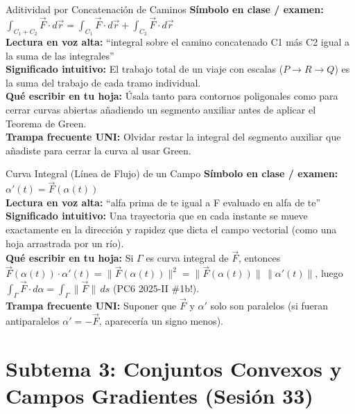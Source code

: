 \documentclass[11pt,a4paper]{article}
\begin{document}
\begin{definicionbox}{Aditividad por Concatenación de Caminos}
\textbf{Símbolo en clase / examen:} $\int_{C_1 + C_2} \vec{F} \cdot d\vec{r} = \int_{C_1} \vec{F} \cdot d\vec{r} + \int_{C_2} \vec{F} \cdot d\vec{r}$\\[0.15cm]
\textbf{Lectura en voz alta:} ``integral sobre el camino concatenado C1 más C2 igual a la suma de las integrales''\\[0.12cm]
\textbf{Significado intuitivo:} El trabajo total de un viaje con escalas ($P \to R \to Q$) es la suma del trabajo de cada tramo individual.\\[0.12cm]
\textbf{Qué escribir en tu hoja:} Úsala tanto para contornos poligonales como para cerrar curvas abiertas añadiendo un segmento auxiliar antes de aplicar el Teorema de Green.\\[0.12cm]
\textbf{Trampa frecuente UNI:} Olvidar restar la integral del segmento auxiliar que añadiste para cerrar la curva al usar Green.
\end{definicionbox}

\begin{definicionbox}{Curva Integral (Línea de Flujo) de un Campo}
\textbf{Símbolo en clase / examen:} $\alpha'(t) = \vec{F}(\alpha(t))$\\[0.15cm]
\textbf{Lectura en voz alta:} ``alfa prima de te igual a F evaluado en alfa de te''\\[0.12cm]
\textbf{Significado intuitivo:} Una trayectoria que en cada instante se mueve exactamente en la dirección y rapidez que dicta el campo vectorial (como una hoja arrastrada por un río).\\[0.12cm]
\textbf{Qué escribir en tu hoja:} Si $\Gamma$ es curva integral de $\vec{F}$, entonces $\vec{F}(\alpha(t)) \cdot \alpha'(t) = \|\vec{F}(\alpha(t))\|^2 = \|\vec{F}(\alpha(t))\|\,\|\alpha'(t)\|$, luego $\int_\Gamma \vec{F}\cdot d\alpha = \int_\Gamma \|\vec{F}\|\,ds$ (PC6 2025-II \#1b!).\\[0.12cm]
\textbf{Trampa frecuente UNI:} Suponer que $\vec{F}$ y $\alpha'$ solo son paralelos (si fueran antiparalelos $\alpha' = -\vec{F}$, aparecería un signo menos).
\end{definicionbox}

\section{Subtema 3: Conjuntos Convexos y Campos Gradientes (Sesión 33)}
\end{document}
